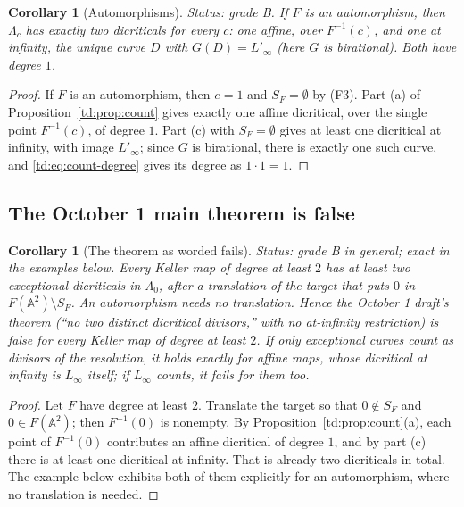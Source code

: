 \documentclass[a4paper,11pt]{article}
\theoremstyle{plain}
\newtheorem{corollary}[theorem]{Corollary}
\theoremstyle{definition}
\theoremstyle{remark}
\begin{document}
\begin{corollary}[Automorphisms]\label{td:cor:automorphisms}
\textit{Status: grade B.}
If $F$ is an automorphism, then $\Lambda_c$ has exactly two dicriticals for every $c$: one
affine, over $F^{-1}(c)$, and one at infinity, the unique curve $D$ with
$G(D) = L'_\infty$ (here $G$ is birational). Both have degree $1$.
\end{corollary}

\begin{proof}
If $F$ is an automorphism, then $e = 1$ and $S_F = \emptyset$ by (F3). Part (a) of
Proposition~\ref{td:prop:count} gives exactly one affine dicritical, over the single point
$F^{-1}(c)$, of degree $1$. Part (c) with $S_F = \emptyset$ gives at least one dicritical at
infinity, with image $L'_\infty$; since $G$ is birational, there is exactly one such curve,
and \eqref{td:eq:count-degree} gives its degree as $1 \cdot 1 = 1$.
\end{proof}

\subsection{The October 1 main theorem is false}

\begin{corollary}[The theorem as worded fails]\label{td:cor:count-fails}
\textit{Status: grade B in general; exact in the examples below.}
Every Keller map of degree at least $2$ has at least two exceptional dicriticals in
$\Lambda_0$, after a translation of the target that puts $0$ in
$F(\mathbb{A}^2) \setminus S_F$. An automorphism needs no translation. Hence the October 1
draft's theorem (``no two distinct dicritical divisors,'' with no at-infinity restriction) is
false for every Keller map of degree at least $2$. If only exceptional curves count as
divisors of the resolution, it holds exactly for affine maps, whose dicritical at infinity is
$L_\infty$ itself; if $L_\infty$ counts, it fails for them too.
\end{corollary}

\begin{proof}
Let $F$ have degree at least $2$. Translate the target so that $0 \notin S_F$ and
$0 \in F(\mathbb{A}^2)$; then $F^{-1}(0)$ is nonempty. By Proposition~\ref{td:prop:count}(a),
each point of $F^{-1}(0)$ contributes an affine dicritical of degree $1$, and by part (c)
there is at least one dicritical at infinity. That is already two dicriticals in total. The
example below exhibits both of them explicitly for an automorphism, where no translation is
needed.
\end{proof}
\end{document}
